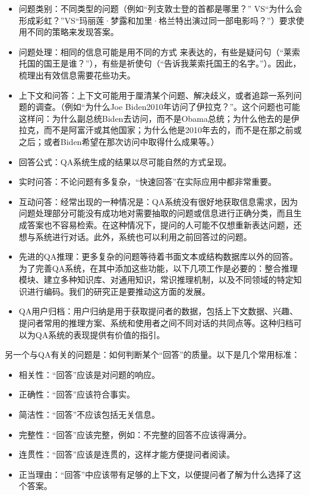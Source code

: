 \begin{itemize}
\item 问题类别：不同类型的问题（例如“列支敦士登的首都是哪里？” VS“为什么会形成彩虹？”VS“玛丽莲·梦露和加里·格兰特出演过同一部电影吗？”）要求使用不同的策略来发现答案。
\item 问题处理：相同的信息可能是用不同的方式 来表达的，有些是疑问句（“莱索托国的国王是谁？”），有些是祈使句（“告诉我莱索托国王的名字。”）。因此，梳理出有效信息需要花些功夫。
\item 上下文和问答：上下文可能用于厘清某个问题、解决歧义，或者追踪一系列问题的调查。（例如“为什么Joe Biden2010年访问了伊拉克？”。这个问题也可能这样问：为什么副总统Biden去访问，而不是Obama总统；为什么他去的是伊拉克，而不是阿富汗或其他国家；为什么他是2010年去的，而不是在那之前或之后；或者Biden希望在那次访问中取得什么成果等。）
\item 回答公式：QA系统生成的结果以尽可能自然的方式呈现。
\item 实时问答：不论问题有多复杂，“快速回答”在实际应用中都非常重要。
\item 互动问答：经常出现的一种情况是：QA系统没有很好地获取信息需求，因为问题处理部分可能没有成功地对需要抽取的问题或信息进行正确分类，而且生成答案也不容易检索。在这种情况下，提问的人可能不仅想重新表达问题，还想与系统进行对话。此外，系统也可以利用之前回答过的问题。
\item 先进的QA推理：更多复杂的问题等待着书面文本或结构数据库以外的回答。为了完善QA系统，在其中添加这些功能，以下几项工作是必要的：整合推理模块、建立多种知识库、对通用知识，常识推理机制，以及不同领域的特定知识进行编码。我们的研究正是要推动这方面的发展。
\item QA用户归档：用户归纳是用于获取提问者的数据，包括上下文数据、兴趣、提问者常用的推理方案、系统和使用者之间不同对话的共同点等。这种归档可以为QA系统的表现提供有价值的指引。
\end{itemize}

另一个与QA有关的问题是：如何判断某个“回答”的质量。以下是几个常用标准：

\begin{itemize}
\item 相关性：“回答”应该是对问题的响应。
\item 正确性：“回答”应该符合事实。
\item 简洁性：“回答”不应该包括无关信息。
\item 完整性：“回答”应该完整，例如：不完整的回答不应该得满分。
\item 连贯性：“回答”应该是连贯的，这样才能方便提问者阅读。
\item 正当理由：“回答”中应该带有足够的上下文，以便提问者了解为什么选择了这个答案。
\end{itemize}

